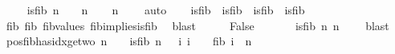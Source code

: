 \begin{isabellebody}
\ \ \isamarkupfalse%
\ {\isachardoublequoteopen}{\isasymnot}\ is{\isacharunderscore}{\kern0pt}fib\ n{\isachardoublequoteclose}\ {\isachardoublequoteopen}{\isasymnot}\ {}\ {\isasymle}\ n{\isachardoublequoteclose}\isanewline
\ \ \isamarkupfalse%
\ {\isachardoublequoteopen}n\ {\isasymin}\ {\isacharbraceleft}{\kern0pt}{}{\isacharcomma}{\kern0pt}{}{\isacharcomma}{\kern0pt}{}{\isacharcomma}{\kern0pt}{}{\isacharbraceright}{\kern0pt}{\isachardoublequoteclose}\ \isamarkupfalse%
\ auto\isanewline
\ \ \isamarkupfalse%
\ {\isachardoublequoteopen}is{\isacharunderscore}{\kern0pt}fib\ {}{\isachardoublequoteclose}\ {\isachardoublequoteopen}is{\isacharunderscore}{\kern0pt}fib\ {}{\isachardoublequoteclose}\ {\isachardoublequoteopen}is{\isacharunderscore}{\kern0pt}fib\ {}{\isachardoublequoteclose}\ {\isachardoublequoteopen}is{\isacharunderscore}{\kern0pt}fib\ {}{\isachardoublequoteclose}\isanewline
\ \ \ \ \isamarkupfalse%
\ fib{}\ fib{}\ fib{\isacharunderscore}{\kern0pt}values\ fib{\isacharunderscore}{\kern0pt}implies{\isacharunderscore}{\kern0pt}is{\isacharunderscore}{\kern0pt}fib\ \isamarkupfalse%
\ blast{\isacharplus}{\kern0pt}\isanewline
\ \ \isamarkupfalse%
\ \isamarkupfalse%
\ False\isanewline
\ \ \ \ \isamarkupfalse%
\ {\isacartoucheopen}{\isasymnot}\ is{\isacharunderscore}{\kern0pt}fib\ n{\isacartoucheclose}\ {\isacartoucheopen}n\ {\isasymin}\ {\isacharbraceleft}{\kern0pt}{}{\isacharcomma}{\kern0pt}{}{\isacharcomma}{\kern0pt}{}{\isacharcomma}{\kern0pt}{}{\isacharbraceright}{\kern0pt}{\isacartoucheclose}\ \isamarkupfalse%
\ blast\isanewline
{}\isamarkupfalse%
%
\endisatagproof
{\isafoldproof}%
%
\isadelimproof
\isanewline
%
\endisadelimproof
\isanewline
{}\isamarkupfalse%
\ pos{\isacharunderscore}{\kern0pt}fib{\isacharunderscore}{\kern0pt}has{\isacharunderscore}{\kern0pt}idx{\isacharunderscore}{\kern0pt}ge{\isacharunderscore}{\kern0pt}two{\isacharcolon}{\kern0pt}\ {\isachardoublequoteopen}n\ {\isachargreater}{\kern0pt}\ {}\ {\isasymLongrightarrow}\ is{\isacharunderscore}{\kern0pt}fib\ n\ {\isasymLongrightarrow}\ {\isacharparenleft}{\kern0pt}{\isasymexists}\ i{\isachardot}{\kern0pt}\ i\ {\isasymge}\ {}\ {\isasymand}\ fib\ i\ {\isacharequal}{\kern0pt}\ n{\isacharparenright}{\kern0pt}{\isachardoublequoteclose}\isanewline

\end{isabellebody}
